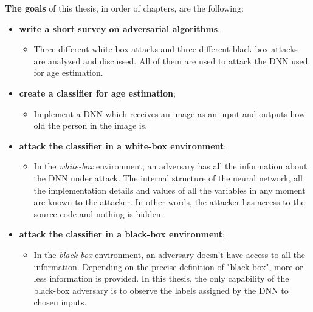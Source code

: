 \textbf{The goals} of this thesis, in order of chapters, are the following:
\begin{itemize}

 \item \textbf{write a short survey on adversarial algorithms}.
  	 \begin{itemize}
  	 \item Three different white-box attacks and three different black-box attacks are analyzed and discussed.  All of them are used to attack the DNN used for age estimation.
 \end{itemize}	
 
  \item \textbf{create a classifier for age estimation};
  	\begin{itemize}
  		\item Implement a DNN which receives an image as an input and outputs how old the person in the image is. 
     \end{itemize}
     
  \item \textbf{attack the classifier in a white-box environment};
  	\begin{itemize}
 		\item In the \textit{white-box} environment, an adversary has all the information about the DNN under attack. The internal structure of the neural network, all the implementation details and values of all the variables in any moment are known to the attacker. In other words, the attacker has access to the source code and nothing is hidden.
 	 \end{itemize}
 	 
 \item \textbf{attack the classifier in a black-box environment}; 
 \begin{itemize}
 	\item In the \textit{black-box} environment, an adversary doesn't have access to all the information. Depending on the precise definition of "black-box", more or less information is provided. In this thesis, the only capability of the black-box adversary is to observe the labels assigned by the DNN to chosen inputs.
 \end{itemize}
 
\end{itemize}

